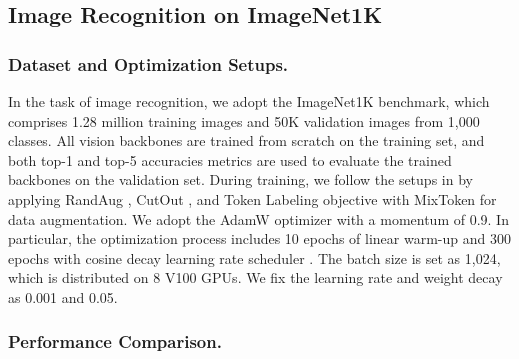 \documentclass[runningheads]{llncs}
\begin{document}
\subsection{Image Recognition on ImageNet1K}
\subsubsection{Dataset and Optimization Setups.} In the task of image recognition, we adopt the ImageNet1K benchmark, which comprises 1.28 million training images and 50K validation images from 1,000 classes. All vision backbones are trained from scratch on the training set, and both top-1 and top-5 accuracies metrics are used to evaluate the trained backbones on the validation set. During training, we follow the setups in \cite{yuan2021volo} by applying RandAug \cite{cubuk2020randaugment}, CutOut \cite{zhong2020random}, and Token Labeling objective with MixToken \cite{jiang2021all} for data augmentation. We adopt the AdamW optimizer \cite{loshchilov2017decoupled} with a momentum of 0.9. In particular, the optimization process includes 10 epochs of linear warm-up and 300 epochs with cosine decay learning rate scheduler \cite{loshchilov2016sgdr}. The batch size is set as 1,024, which is distributed on 8 V100 GPUs. We fix the learning rate and weight decay as 0.001 and 0.05.

\subsubsection{Performance Comparison.}
\end{document}
